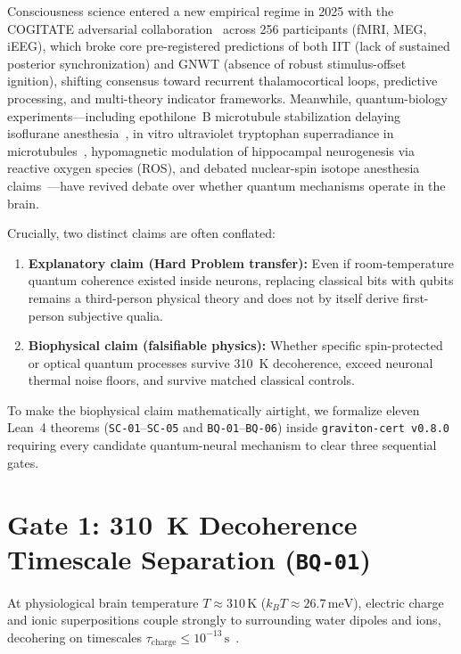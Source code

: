\documentclass[11pt,a4paper]{article}
\theoremstyle{plain}
\theoremstyle{remark}
\newcommand{\code}[1]{\texttt{\small #1}}
\begin{document}
Consciousness science entered a new empirical regime in 2025 with the COGITATE adversarial collaboration~\cite{COGITATE2025} across 256 participants (fMRI, MEG, iEEG), which broke core pre-registered predictions of both IIT (lack of sustained posterior synchronization) and GNWT (absence of robust stimulus-offset ignition), shifting consensus toward recurrent thalamocortical loops, predictive processing, and multi-theory indicator frameworks. Meanwhile, quantum-biology experiments—including epothilone~B microtubule stabilization delaying isoflurane anesthesia~\cite{Wiest2024}, in vitro ultraviolet tryptophan superradiance in microtubules~\cite{Babcock2024}, hypomagnetic modulation of hippocampal neurogenesis via reactive oxygen species (ROS), and debated nuclear-spin isotope anesthesia claims~\cite{Fisher2015}—have revived debate over whether quantum mechanisms operate in the brain.

Crucially, two distinct claims are often conflated:
\begin{enumerate}
  \item \textbf{Explanatory claim (Hard Problem transfer):} Even if room-temperature quantum coherence existed inside neurons, replacing classical bits with qubits remains a third-person physical theory and does not by itself derive first-person subjective qualia.
  \item \textbf{Biophysical claim (falsifiable physics):} Whether specific spin-protected or optical quantum processes survive 310~K decoherence, exceed neuronal thermal noise floors, and survive matched classical controls.
\end{enumerate}

To make the biophysical claim mathematically airtight, we formalize eleven Lean~4 theorems (\code{SC-01}--\code{SC-05} and \code{BQ-01}--\code{BQ-06}) inside \code{graviton-cert v0.8.0} requiring every candidate quantum-neural mechanism to clear three sequential gates.

\section{Gate 1: 310~K Decoherence Timescale Separation (\code{BQ-01})}

At physiological brain temperature $T \approx 310\,\mathrm{K}$ ($k_B T \approx 26.7\,\mathrm{meV}$), electric charge and ionic superpositions couple strongly to surrounding water dipoles and ions, decohering on timescales $\tau_{\mathrm{charge}} \le 10^{-13}\,\mathrm{s}$~\cite{Tegmark2000}.
\end{document}
